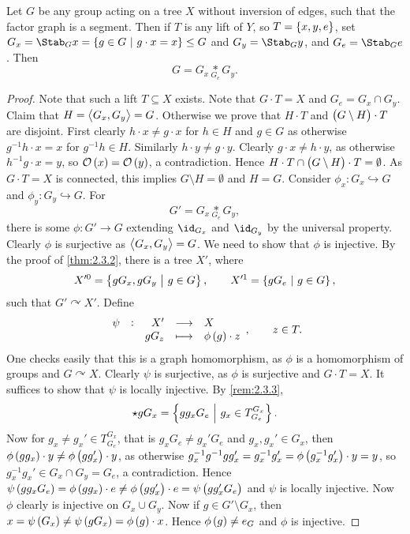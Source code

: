 \begin{theorem}
\label{thm:2.3.4}
Let $ G $ be any group acting on a tree $ X $ without inversion of edges, such that the factor graph is a segment. Then if $ T $ is any lift of $ Y $, so $ T = \cbr{x, y, e} $, set $ G_x = \Stab_G x = \cbr{g \in G \st g \cdot x = x} \le G $ and $ G_y = \Stab_G y $, and $ G_e = \Stab_G e $. Then
$$ G = G_x \underset{G_e}{*} G_y. $$
\end{theorem}

\begin{proof}
Note that such a lift $ T \subseteq X $ exists. Note that $ G \cdot T = X $ and $ G_e = G_x \cap G_y $. Claim that $ H = \left\langle G_x, G_y \right\rangle = G $. Otherwise we prove that $ H \cdot T $ and $ \br{G \setminus H} \cdot T $ are disjoint. First clearly $ h \cdot x \ne g \cdot x $ for $ h \in H $ and $ g \in G $ as otherwise $ g^{-1}h \cdot x = x $ for $ g^{-1}h \in H $. Similarly $ h \cdot y \ne g \cdot y $. Clearly $ g \cdot x \ne h \cdot y $, as otherwise $ h^{-1}g \cdot x = y $, so $ \OOO\br{x} = \OOO\br{y} $, a contradiction. Hence $ H \cdot T \cap \br{G \setminus H} \cdot T = \emptyset $. As $ G \cdot T = X $ is connected, this implies $ G \setminus H = \emptyset $ and $ H = G $. Consider $ \phi_x : G_x \hookrightarrow G $ and $ \phi_y : G_y \hookrightarrow G $. For
$$ G' = G_x \underset{G_e}{*} G_y, $$
there is some $ \phi : G' \to G $ extending $ \id_{G_x} $ and $ \id_{G_y} $ by the universal property. Clearly $ \phi $ is surjective as $ \left\langle G_x, G_y \right\rangle = G $. We need to show that $ \phi $ is injective. By the proof of \ref{thm:2.3.2}, there is a tree $ X' $, where
$$ X'^0 = \cbr{gG_x, gG_y \st g \in G}, \qquad X'^1 = \cbr{gG_e \st g \in G}, $$
such that $ G' \curvearrowright X' $. Define
$$ \function[\psi]{X'}{X}{gG_z}{\phi\br{g} \cdot z}, \qquad z \in T. $$
One checks easily that this is a graph homomorphism, as $ \phi $ is a homomorphism of groups and $ G \curvearrowright X $. Clearly $ \psi $ is surjective, as $ \phi $ is surjective and $ G \cdot T = X $. It suffices to show that $ \psi $ is locally injective. By \ref{rem:2.3.3},
$$ \star gG_x = \cbr{gg_xG_e \st g_x \in T_{G_e}^{G_x}}. $$
Now for $ g_x \ne g_x' \in T_{G_e}^{G_x} $, that is $ g_xG_e \ne g_x'G_e $ and $ g_x, g_x' \in G_x $, then $ \phi\br{gg_x} \cdot y \ne \phi\br{gg_x'} \cdot y $, as otherwise $ g_x^{-1}g^{-1}gg_x' = g_x^{-1}g_x' = \phi\br{g_x^{-1}g_x'} \cdot y = y $, so $ g_x^{-1}g_x' \in G_x \cap G_y = G_e $, a contradiction. Hence $ \psi\br{gg_xG_e} = \phi\br{gg_x} \cdot e \ne \phi\br{gg_x'} \cdot e = \psi\br{gg_x'G_e} $ and $ \psi $ is locally injective. Now $ \phi $ clearly is injective on $ G_x \cup G_y $. Now if $ g \in G' \setminus G_x $, then $ x = \psi\br{G_x} \ne \psi\br{gG_x} = \phi\br{g} \cdot x $. Hence $ \phi\br{g} \ne e_G $ and $ \phi $ is injective.
\end{proof}

